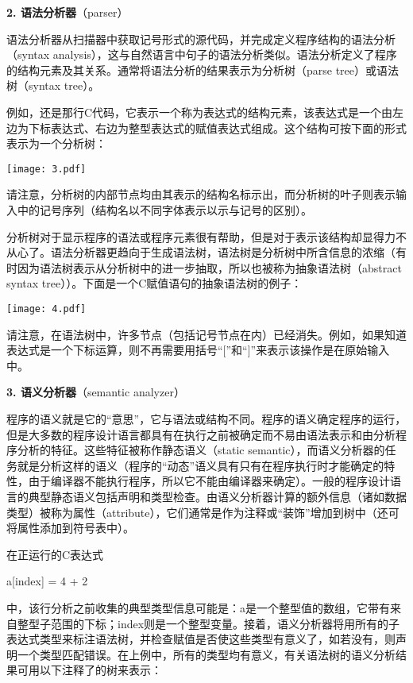 \documentclass[lang=cn,10pt]{elegantbook}
\begin{document}
\textbf{2. 语法分析器}（parser）

语法分析器从扫描器中获取记号形式的源代码，并完成定义程序结构的语法分析（syntax analysis），这与自然语言中句子的语法分析类似。语法分析定义了程序的结构元素及其关系。通常将语法分析的结果表示为分析树（parse tree）或语法树（syntax tree）。

例如，还是那行C代码，它表示一个称为表达式的结构元素，该表达式是一个由左边为下标表达式、右边为整型表达式的赋值表达式组成。这个结构可按下面的形式表示为一个分析树：

\begin{center}
  \texttt{[image: 3.pdf]}
\end{center}

请注意，分析树的内部节点均由其表示的结构名标示出，而分析树的叶子则表示输入中的记号序列（结构名以不同字体表示以示与记号的区别）。

分析树对于显示程序的语法或程序元素很有帮助，但是对于表示该结构却显得力不从心了。语法分析器更趋向于生成语法树，语法树是分析树中所含信息的浓缩（有时因为语法树表示从分析树中的进一步抽取，所以也被称为抽象语法树（abstract syntax tree））。下面是一个C赋值语句的抽象语法树的例子：

\begin{center}
  \texttt{[image: 4.pdf]}
\end{center}

请注意，在语法树中，许多节点（包括记号节点在内）已经消失。例如，如果知道表达式是一个下标运算，则不再需要用括号“[”和“]”来表示该操作是在原始输入中。

\textbf{3. 语义分析器}（semantic analyzer）

程序的语义就是它的“意思”，它与语法或结构不同。程序的语义确定程序的运行，但是大多数的程序设计语言都具有在执行之前被确定而不易由语法表示和由分析程序分析的特征。这些特征被称作静态语义（static semantic），而语义分析器的任务就是分析这样的语义（程序的“动态”语义具有只有在程序执行时才能确定的特性，由于编译器不能执行程序，所以它不能由编译器来确定）。一般的程序设计语言的典型静态语义包括声明和类型检查。由语义分析器计算的额外信息（诸如数据类型）被称为属性（attribute），它们通常是作为注释或“装饰”增加到树中（还可将属性添加到符号表中）。

在正运行的C表达式

a[index] = 4 + 2

中，该行分析之前收集的典型类型信息可能是：a是一个整型值的数组，它带有来自整型子范围的下标；index则是一个整型变量。接着，语义分析器将用所有的子表达式类型来标注语法树，并检查赋值是否使这些类型有意义了，如若没有，则声明一个类型匹配错误。在上例中，所有的类型均有意义，有关语法树的语义分析结果可用以下注释了的树来表示：
\end{document}
